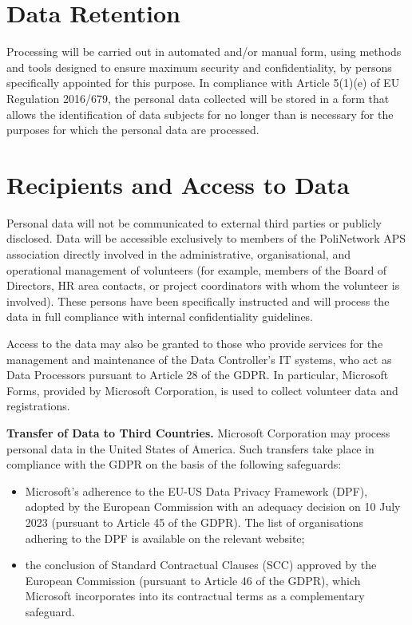 \documentclass[legal]{polinetwork}
\begin{document}
\section{Data Retention}

Processing will be carried out in automated and/or manual form, using methods and tools designed to ensure maximum security and confidentiality, by persons specifically appointed for this purpose. In compliance with Article 5(1)(e) of EU Regulation 2016/679, the personal data collected will be stored in a form that allows the identification of data subjects for no longer than is necessary for the purposes for which the personal data are processed.

\section{Recipients and Access to Data}

Personal data will not be communicated to external third parties or publicly disclosed. Data will be accessible exclusively to members of the PoliNetwork APS association directly involved in the administrative, organisational, and operational management of volunteers (for example, members of the Board of Directors, HR area contacts, or project coordinators with whom the volunteer is involved). These persons have been specifically instructed and will process the data in full compliance with internal confidentiality guidelines.

Access to the data may also be granted to those who provide services for the management and maintenance of the Data Controller's IT systems, who act as Data Processors pursuant to Article 28 of the GDPR. In particular, Microsoft Forms, provided by Microsoft Corporation, is used to collect volunteer data and registrations.

\textbf{Transfer of Data to Third Countries.} Microsoft Corporation may process personal data in the United States of America. Such transfers take place in compliance with the GDPR on the basis of the following safeguards:

\begin{itemize}
	\item Microsoft's adherence to the EU-US Data Privacy Framework (DPF), adopted by the European Commission with an adequacy decision on 10 July 2023 (pursuant to Article 45 of the GDPR). The list of organisations adhering to the DPF is available on the relevant website;
	\item the conclusion of Standard Contractual Clauses (SCC) approved by the European Commission (pursuant to Article 46 of the GDPR), which Microsoft incorporates into its contractual terms as a complementary safeguard.
\end{itemize}
\end{document}
